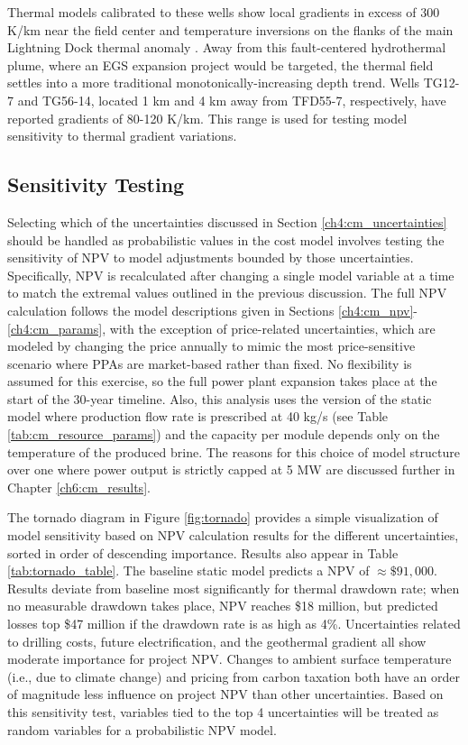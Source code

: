 Thermal models calibrated to these wells show local gradients in excess of 300 K/km near the field center and temperature inversions on the flanks of the main Lightning Dock thermal anomaly \citep[see Figs.\ 23-24]{cunniff_final_2005}. Away from this fault-centered hydrothermal plume, where an EGS expansion project would be targeted, the thermal field settles into a more traditional monotonically-increasing depth trend. Wells TG12-7 and TG56-14, located 1 km and 4 km away from TFD55-7, respectively, have reported gradients of 80-120 K/km. This range is used for testing model sensitivity to thermal gradient variations.

\subsection{Sensitivity Testing}
\label{ch4:sensitivity}

Selecting which of the uncertainties discussed in Section \ref{ch4:cm_uncertainties} should be handled as probabilistic values in the cost model involves testing the sensitivity of NPV to model adjustments bounded by those uncertainties. Specifically, NPV is recalculated after changing a single model variable at a time to match the extremal values outlined in the previous discussion. The full NPV calculation follows the model descriptions given in Sections \ref{ch4:cm_npv}-\ref{ch4:cm_params}, with the exception of price-related uncertainties, which are modeled by changing the price annually to mimic the most price-sensitive scenario where PPAs are market-based rather than fixed. No flexibility is assumed for this exercise, so the full power plant expansion takes place at the start of the 30-year timeline. Also, this analysis uses the version of the static model where production flow rate is prescribed at 40 kg/s (see Table \ref{tab:cm_resource_params}) and the capacity per module depends only on the temperature of the produced brine. The reasons for this choice of model structure over one where power output is strictly capped at 5 MW are discussed further in Chapter \ref{ch6:cm_results}.

The tornado diagram in Figure \ref{fig:tornado} provides a simple visualization of model sensitivity based on NPV calculation results for the different uncertainties, sorted in order of descending importance. Results also appear in Table \ref{tab:tornado_table}. The baseline static model predicts a NPV of $\approx \$91,000$. Results deviate from baseline most significantly for thermal drawdown rate; when no measurable drawdown takes place, NPV reaches \$18 million, but predicted losses top \$47 million if the drawdown rate is as high as 4\%. Uncertainties related to drilling costs, future electrification, and the geothermal gradient all show moderate importance for project NPV. Changes to ambient surface temperature (i.e., due to climate change) and pricing from carbon taxation both have an order of magnitude less influence on project NPV than other uncertainties. Based on this sensitivity test, variables tied to the top 4 uncertainties will be treated as random variables for a probabilistic NPV model.

